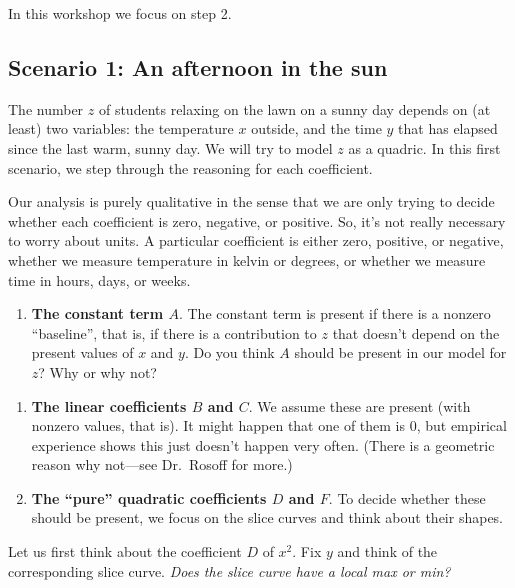 \documentclass[12pt]{exam}
\theoremstyle{definition}
\begin{document}
In this workshop we focus on step 2.

\subsection{Scenario 1: An afternoon in the sun}

The number $z$ of students relaxing on the lawn on a sunny day depends
on (at least) two variables: the temperature $x$ outside, and the time
$y$ that has elapsed since the last warm, sunny day. We will try to
model $z$ as a quadric. In this first scenario, we step through the
reasoning for each coefficient.

Our analysis is purely qualitative in the sense that we are only trying
to decide whether each coefficient is zero, negative, or positive. So,
it's not really necessary to worry about units. A particular coefficient
is either zero, positive, or negative, whether we measure temperature in
kelvin or degrees, or whether we measure time in hours, days, or weeks.

\newpage

\begin{enumerate}
\def\labelenumi{\arabic{enumi}.}
\itemsep1pt\parskip0pt
\item
  \textbf{The constant term $A$}. The constant term is present if there
  is a nonzero ``baseline'', that is, if there is a contribution to $z$
  that doesn't depend on the present values of $x$ and $y$. Do you think
  $A$ should be present in our model for $z$? Why or why not?
\end{enumerate}


\begin{enumerate}
\def\labelenumi{\arabic{enumi}.}
\setcounter{enumi}{1}
\item
  \textbf{The linear coefficients $B$ and $C$}. We assume these are
  present (with nonzero values, that is). It might happen that one of
  them is 0, but empirical experience shows this just doesn't happen
  very often. (There is a geometric reason why not---see Dr.~Rosoff for
  more.)
\item
  \textbf{The ``pure'' quadratic coefficients $D$ and $F$}. To decide
  whether these should be present, we focus on the slice curves and
  think about their shapes.
\end{enumerate}

Let us first think about the coefficient $D$ of $x^2$. Fix $y$ and think
of the corresponding slice curve. \emph{Does the slice curve have a
local max or min?}
\end{document}
